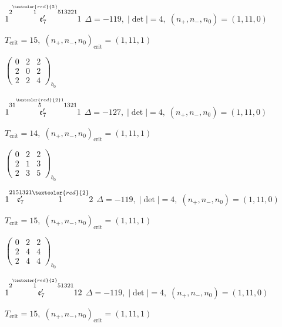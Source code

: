 \documentclass[10pt]{article}
\begin{document}
\smallskip

$1\overset{2\overset{\textcolor{red}{2}}{1}513221}{\mathfrak{e}_7'}1$ \quad $\Delta=-119,\; |\det|=4,\; (n_+,n_-,n_0)=(1,11,0)$

\hspace{1em}$T_{\text{crit}}=15,\; (n_+,n_-,n_0)_{\text{crit}}=(1,11,1)$

\hspace{2em}$\left(\begin{smallmatrix}0 & 2 & 2 \\ 2 & 0 & 2 \\ 2 & 2 & 4\end{smallmatrix}\right)_{\!b_0}$

\smallskip

$1\overset{31\overset{\textcolor{red}{2}1}{5}1321}{\mathfrak{e}_7'}1$ \quad $\Delta=-127,\; |\det|=4,\; (n_+,n_-,n_0)=(1,11,0)$

\hspace{1em}$T_{\text{crit}}=14,\; (n_+,n_-,n_0)_{\text{crit}}=(1,11,1)$

\hspace{2em}$\left(\begin{smallmatrix}0 & 2 & 2 \\ 2 & 1 & 3 \\ 2 & 3 & 5\end{smallmatrix}\right)_{\!b_0}$

\smallskip

$1\overset{2151321}{\mathfrak{e}_7'}\overset{\textcolor{red}{2}}{1}2$ \quad $\Delta=-119,\; |\det|=4,\; (n_+,n_-,n_0)=(1,11,0)$

\hspace{1em}$T_{\text{crit}}=15,\; (n_+,n_-,n_0)_{\text{crit}}=(1,11,1)$

\hspace{2em}$\left(\begin{smallmatrix}0 & 2 & 2 \\ 2 & 4 & 4 \\ 2 & 4 & 4\end{smallmatrix}\right)_{\!b_0}$

$1\overset{2\overset{\textcolor{red}{2}}{1}51321}{\mathfrak{e}_7'}12$ \quad $\Delta=-119,\; |\det|=4,\; (n_+,n_-,n_0)=(1,11,0)$

\hspace{1em}$T_{\text{crit}}=15,\; (n_+,n_-,n_0)_{\text{crit}}=(1,11,1)$
\end{document}
